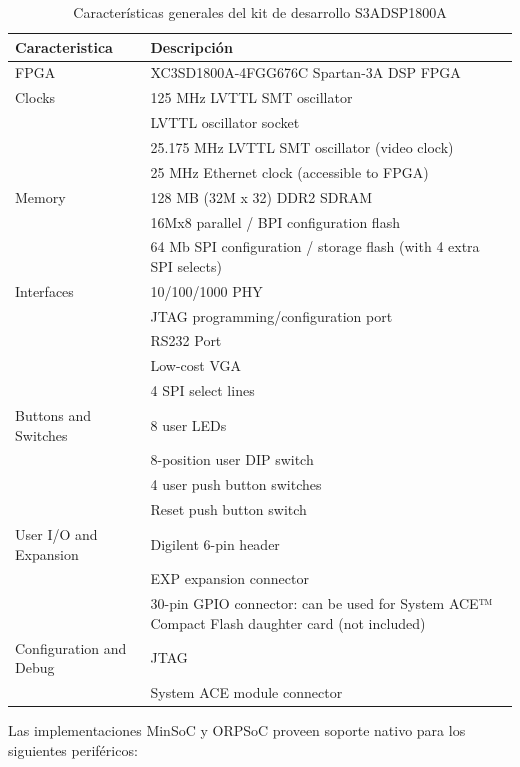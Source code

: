 				\begin {table} [!h]
				\begin{tabular}{ p{4cm} p{10cm} }
				\rowcolor[gray]{0.8} Caracteristica & Descripción \\		
				\hline FPGA   & XC3SD1800A-4FGG676C Spartan-3A DSP FPGA\\
				\hline Clocks & 125 MHz LVTTL SMT oscillator\\
				\hline        & LVTTL oscillator socket\\
				\hline		  & 25.175 MHz LVTTL SMT oscillator (video clock)\\
				\hline		  & 25 MHz Ethernet clock (accessible to FPGA)\\
				\hline Memory & 128 MB (32M x 32) DDR2 SDRAM\\
				\hline		  & 16Mx8 parallel / BPI configuration flash\\
				\hline 		  & 64 Mb SPI configuration / storage flash (with 4 extra SPI selects)\\
				\hline Interfaces & 10/100/1000 PHY\\
				\hline			  & JTAG programming/configuration port\\
				\hline            & RS232 Port\\
				\hline			  & Low-cost VGA\\
				\hline			  & 4 SPI select lines\\
				\hline Buttons and Switches & 8 user LEDs\\
				\hline  		  & 8-position user DIP switch\\
				\hline            & 4 user push button switches\\
				\hline 			  & Reset push button switch\\
				\hline User I/O and Expansion & Digilent 6-pin header\\
				\hline			 			  & EXP expansion connector\\
				\hline 						  & 30-pin GPIO connector: can be used for System ACE™ Compact Flash daughter card (not included)\\
				\hline Configuration and Debug & JTAG\\
				\hline                         & System ACE module connector\\   
				\end{tabular}
				\caption {Características generales del kit de desarrollo S3ADSP1800A}
				\end {table}
				
				Las implementaciones MinSoC y ORPSoC proveen soporte nativo para los siguientes periféricos:
				
